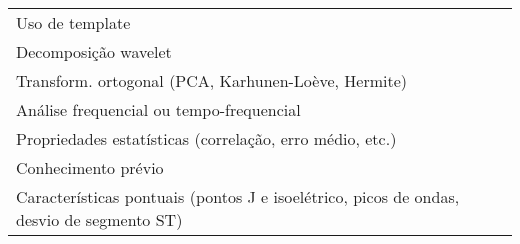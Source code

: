 \begin{tabular}{p{140pt}p{280pt}}
    \toprule
    Uso de template &
    \cite{Akselrod1987, Garcia2000, Couceiro2008, Mohebbi2007}\\
    Decomposição wavelet &
    \cite{Ranjith2003, Senhadji1995, Milosavljevic2006}\\
    Transform. ortogonal (PCA, Karhunen-Loève, Hermite) &
    \cite{Castells2007, Rocha2010, Afsar2007, Gopalakrishnan2004, Pang2005}\\
    Análise frequencial ou tempo-frequencial &
    \cite{Rocha2010, Senhadji1995, Badilini1992, Couceiro2008}\\
    Propriedades estatísticas (correlação, erro médio, etc.) &
    \cite{Ranjith2003, Badilini1992, Couceiro2008, Garcia2000}\\
    Conhecimento prévio &
    \cite{Elgendi2013, Papaloukas2000}\\
    Características pontuais (pontos J e isoelétrico, picos de ondas, desvio de segmento ST) &
    \cite{Akselrod1987, Goletsis2004, Papaloukas2000, Ranjith2003, Rocha2010, Senhadji1995, Vila1997, Badilini1992, Couceiro2008, Mohebbi2007}\\
    \bottomrule
\end{tabular}